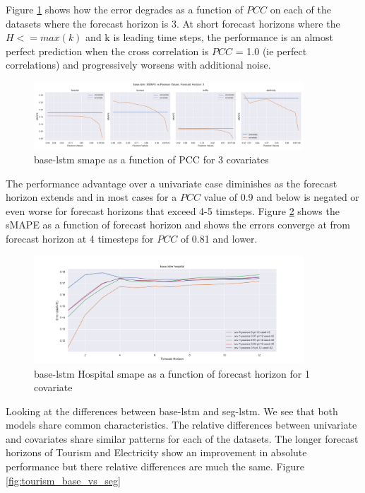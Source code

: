 \documentclass{article}
\newcommand{\horizon}{H}
\newcommand{\pearson}{PCC}
\begin{document}
Figure \ref{fig:lstm_smape_vs_pearson} shows how the error degrades as a function of $\pearson$ on each of the datasets where the 
forecast horizon is 3.  At short forecast horizons where the $\horizon <= max(k)$ 
and k is leading time steps, the performance is an almost perfect prediction when the  cross correlation is $\pearson$ = 1.0 (ie perfect correlations) and progressively worsens with additional noise.


\begin{figure}[ht]
\centering
\includegraphics[width=0.9\textwidth]{figures/base-lstm_smape_vs_pearson.png}
\caption{base-lstm smape as a function of PCC for 3 covariates}
\label{fig:lstm_smape_vs_pearson}
\end{figure}


The performance advantage over a univariate case diminishes as the forecast horizon extends and in most cases for a $\pearson$ value of 0.9 and below is negated 
or even worse for forecast horizons that exceed 4-5 timsteps. Figure \ref{fig:hospital_smape} shows the sMAPE as a function of forecast horizon and shows the errors 
converge at from forecast horizon at 4 timesteps for $\pearson$ of 0.81 and lower.

\begin{figure}[ht]
\centering
\includegraphics[width=0.9\textwidth]{figures/base-lstm-hospital-sMAPE.png}
\caption{base-lstm Hospital smape as a function of forecast horizon for 1 covariate}
\label{fig:hospital_smape}
\end{figure}

Looking at the differences between base-lstm and seg-lstm. We see that both models share common characteristics. The relative differences between univariate 
and covariates share similar patterns for each of the datasets. The longer forecast horizons of Tourism and Electricity show an improvement in absolute performance 
but there relative differences are much the same. Figure \ref{fig:tourism_base_vs_seg}
\end{document}
